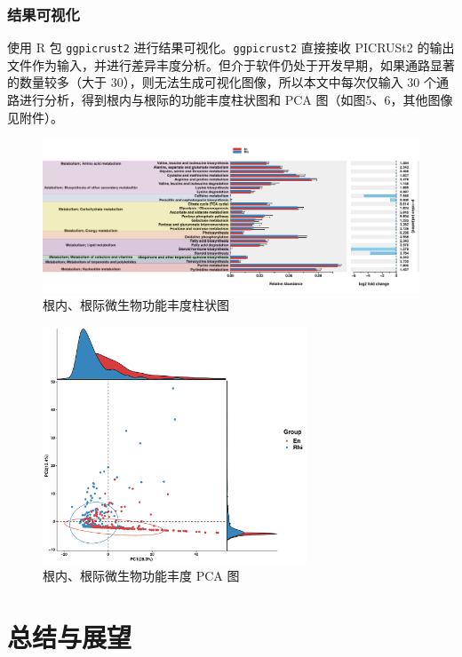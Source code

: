 \documentclass[UTF8]{ctexart}
\begin{document}
    \subsubsection{结果可视化}
    使用 R 包 \verb|ggpicrust2| \cite{ref8}进行结果可视化。\verb|ggpicrust2| 直接接收 PICRUSt2 的输出文件作为输入，并进行差异丰度分析。但介于软件仍处于开发早期，如果通路显著的数量较多（大于 30），则无法生成可视化图像，所以本文中每次仅输入 30 个通路进行分析，得到根内与根际的功能丰度柱状图和 PCA 图（如图5、6，其他图像见附件）。

    \begin{figure}[!htbp]
        \centering
        \includegraphics*[width=\textwidth]{img/RelativeAbundance30.pdf}
        \caption{根内、根际微生物功能丰度柱状图}
    \end{figure}

    \begin{figure}[!htbp]
        \centering
        \includegraphics*[width=0.7\textwidth]{img/PCA_KO.pdf}
        \caption{根内、根际微生物功能丰度 PCA 图}
    \end{figure}


    \section{总结与展望}
\end{document}
